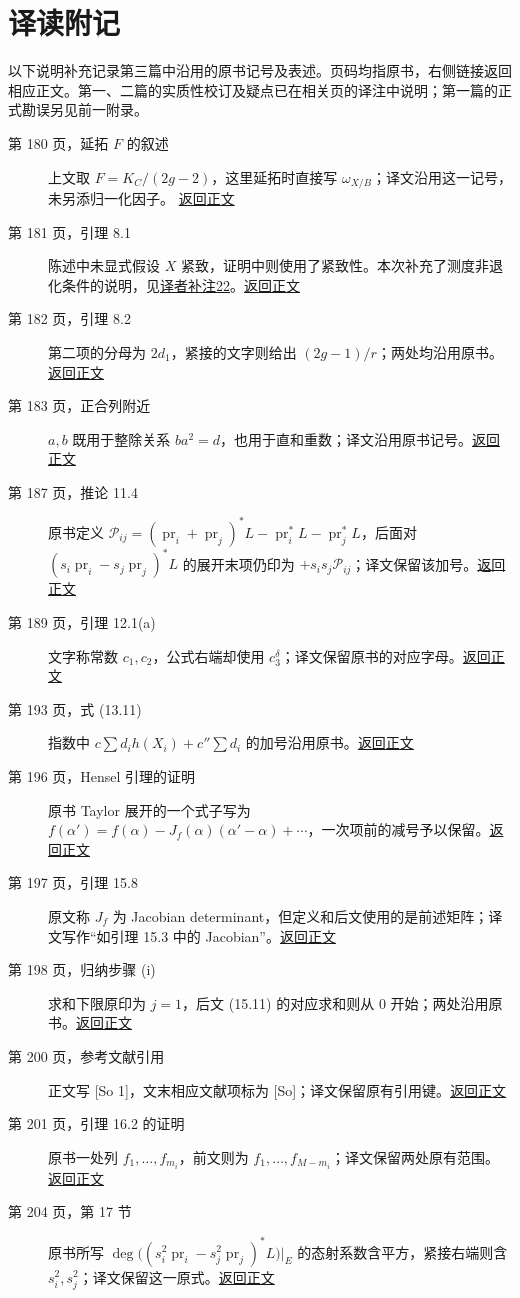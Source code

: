 \chapter*{译读附记}
以下说明补充记录第三篇中沿用的原书记号及表述。页码均指原书，右侧链接返回相应正文。第一、二篇的实质性校订及疑点已在相关页的译注中说明；第一篇的正式勘误另见前一附录。

\begin{description}
\item[第 180 页，延拓 $F$ 的叙述]
上文取 $F=K_C/(2g-2)$，这里延拓时直接写 $\omega_{X/B}$；译文沿用这一记号，未另添归一化因子。
\hfill\hyperref[orig:185]{返回正文}
\item[第 181 页，引理 8.1]
陈述中未显式假设 $X$ 紧致，证明中则使用了紧致性。本次补充了测度非退化条件的说明，见\hyperlink{translator-note-22}{译者补注22}。\hfill\hyperref[orig:186]{返回正文}
\item[第 182 页，引理 8.2]
第二项的分母为 $2d_1$，紧接的文字则给出 $(2g-1)/r$；两处均沿用原书。\hfill\hyperref[orig:187]{返回正文}
\item[第 183 页，正合列附近]
$a,b$ 既用于整除关系 $ba^2=d$，也用于直和重数；译文沿用原书记号。\hfill\hyperref[orig:188]{返回正文}
\item[第 187 页，推论 11.4]
原书定义 $\mathscr P_{ij}=(\operatorname{pr}_i+\operatorname{pr}_j)^*L-\operatorname{pr}_i^*L-\operatorname{pr}_j^*L$，后面对 $(s_i\operatorname{pr}_i-s_j\operatorname{pr}_j)^*L$ 的展开末项仍印为 $+s_is_j\mathscr P_{ij}$；译文保留该加号。\hfill\hyperref[orig:192]{返回正文}
\item[第 189 页，引理 12.1(a)]
文字称常数 $c_1,c_2$，公式右端却使用 $c_3^{\delta}$；译文保留原书的对应字母。\hfill\hyperref[orig:194]{返回正文}
\item[第 193 页，式 (13.11)]
指数中 $c\sum d_i h(X_i)+c''\sum d_i$ 的加号沿用原书。\hfill\hyperref[orig:198]{返回正文}
\item[第 196 页，Hensel 引理的证明]
原书 Taylor 展开的一个式子写为 $f(\alpha')=f(\alpha)-J_f(\alpha)(\alpha'-\alpha)+\cdots$，一次项前的减号予以保留。\hfill\hyperref[orig:201]{返回正文}
\item[第 197 页，引理 15.8]
原文称 $J_f$ 为 Jacobian determinant，但定义和后文使用的是前述矩阵；译文写作“如引理 15.3 中的 Jacobian”。\hfill\hyperref[orig:202]{返回正文}
\item[第 198 页，归纳步骤 (i)]
求和下限原印为 $j=1$，后文 (15.11) 的对应求和则从 $0$ 开始；两处沿用原书。\hfill\hyperref[orig:203]{返回正文}
\item[第 200 页，参考文献引用]
正文写 [So 1]，文末相应文献项标为 [So]；译文保留原有引用键。\hfill\hyperref[orig:205]{返回正文}
\item[第 201 页，引理 16.2 的证明]
原书一处列 $f_1,\ldots,f_{m_i}$，前文则为 $f_1,\ldots,f_{M-m_i}$；译文保留两处原有范围。\hfill\hyperref[orig:206]{返回正文}
\item[第 204 页，第 17 节]
原书所写 $\deg\bigl((s_i^2\operatorname{pr}_i-s_j^2\operatorname{pr}_j)^*L\bigr)|_E$ 的态射系数含平方，紧接右端则含 $s_i^2,s_j^2$；译文保留这一原式。\hfill\hyperref[orig:209]{返回正文}
\end{description}
